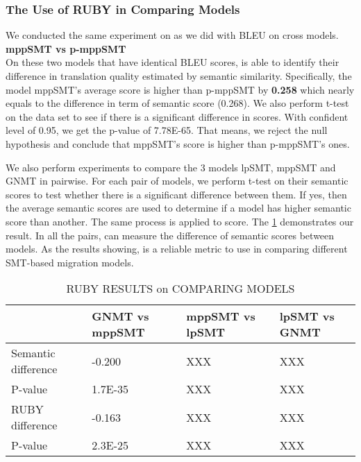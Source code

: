 \subsubsection{The Use of RUBY in Comparing Models}
We conducted the same experiment on {\model} as we did with BLEU on cross models. \\ 
\textbf{mppSMT vs p-mppSMT}\\
On these two models that have identical BLEU scores, {\model} is able to identify their difference in translation quality estimated by semantic similarity. Specifically, the model mppSMT's average {\model} score is higher than p-mppSMT by \textbf{0.258} which nearly equals to the difference in term of semantic score (0.268). We also perform t-test on the data set to see if there is a significant difference in {\model} scores. With confident level of 0.95, we get the p-value of 7.78E-65. That means, we reject the null hypothesis and conclude that mppSMT's {\model} score is higher than p-mppSMT's ones.

We also perform experiments to compare the 3 models lpSMT, mppSMT and GNMT in pairwise. For each pair of models, we perform t-test on their semantic scores to test whether there is a significant difference between them. If yes, then the average semantic scores are used to determine if a model has higher semantic score than another. The same process is applied to {\model} score. The \ref{table:rubyCross} demonstrates our result. In all the pairs, {\model} can measure the difference of semantic scores between models. 
As the results showing, {\model} is a reliable metric to use in comparing different SMT-based migration models. 	

\begin{table}
\centering
\caption{RUBY RESULTS on COMPARING MODELS}
\begin{tabular}{|p{2.3cm}|p{1.4cm}|p{1.4cm}|p{1.4cm}|}
\hline
 & GNMT vs mppSMT & mppSMT vs lpSMT & lpSMT vs GNMT\\
\hline
Semantic difference & -0.200 & XXX & XXX \\
\hline
P-value  & 1.7E-35 & XXX & XXX \\
\hline
RUBY difference & -0.163 & XXX & XXX \\
\hline
P-value & 2.3E-25 & XXX & XXX \\
\hline
\end{tabular}
\label{table:rubyCross}
\end{table}